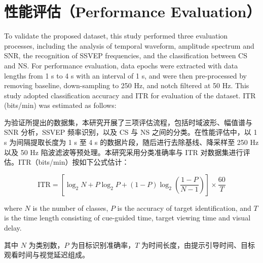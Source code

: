 \documentclass[11pt]{ctexart}
\newenvironment{en}{\begin{enbox}\color{black!85}}{\end{enbox}}
\newenvironment{zh}{\begin{zhbox}}{\end{zhbox}}
\begin{document}
\section{性能评估（Performance Evaluation）}
\begin{en}
To validate the proposed dataset, this study performed three evaluation processes, including the analysis of temporal waveform, amplitude spectrum and SNR, the recognition of SSVEP frequencies, and the classification between CS and NS. For performance evaluation, data epochs were extracted with data lengths from 1 s to 4 s with an interval of 1 s, and were then pre-processed by removing baseline, down-sampling to 250 Hz, and notch filtered at 50 Hz. This study adopted classification accuracy and ITR for evaluation of the dataset. ITR (bits/min) was estimated as follows:
\end{en}
\begin{zh}
为验证所提出的数据集，本研究开展了三项评估流程，包括时域波形、幅值谱与 SNR 分析，SSVEP 频率识别，以及 CS 与 NS 之间的分类。在性能评估中，以 1 s 为间隔提取长度为 1 s 至 4 s 的数据片段，随后进行去除基线、降采样至 250 Hz 以及 50 Hz 陷波滤波等预处理。本研究采用分类准确率与 ITR 对数据集进行评估。ITR（bits/min）按如下公式估计：
\end{zh}

\begin{equation}
\mathrm{ITR}=\left[\log_2 N + P\log_2 P + (1-P)\log_2\!\left(\frac{1-P}{N-1}\right)\right]\times\frac{60}{T}
\end{equation}

\begin{en}
where $N$ is the number of classes, $P$ is the accuracy of target identification, and $T$ is the time length consisting of cue-guided time, target viewing time and visual delay.
\end{en}
\begin{zh}
其中 $N$ 为类别数，$P$ 为目标识别准确率，$T$ 为时间长度，由提示引导时间、目标观看时间与视觉延迟组成。
\end{zh}
\end{document}

